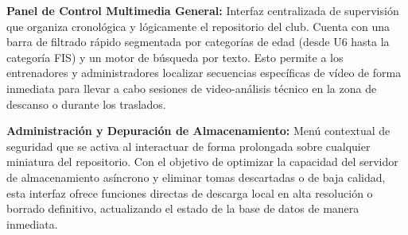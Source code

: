 \noindent \textbf{Panel de Control Multimedia General:} Interfaz centralizada de supervisión que organiza cronológica y lógicamente el repositorio del club. Cuenta con una barra de filtrado rápido segmentada por categorías de edad (desde U6 hasta la categoría FIS) y un motor de búsqueda por texto. Esto permite a los entrenadores y administradores localizar secuencias específicas de vídeo de forma inmediata para llevar a cabo sesiones de video-análisis técnico en la zona de descanso o durante los traslados. \par \smallskip

\noindent \textbf{Administración y Depuración de Almacenamiento:} Menú contextual de seguridad que se activa al interactuar de forma prolongada sobre cualquier miniatura del repositorio. Con el objetivo de optimizar la capacidad del servidor de almacenamiento asíncrono y eliminar tomas descartadas o de baja calidad, esta interfaz ofrece funciones directas de descarga local en alta resolución o borrado definitivo, actualizando el estado de la base de datos de manera inmediata.

